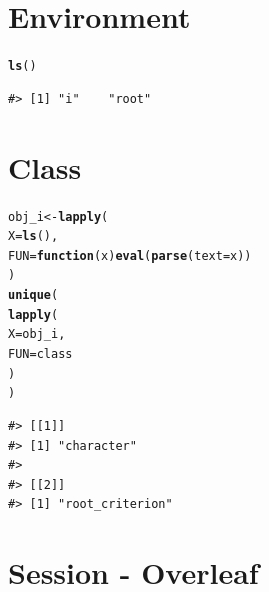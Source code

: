 \documentclass{article}\usepackage[]{graphicx}\usepackage{xcolor}
\makeatletter
\newcommand{\hlstd}[1]{\textcolor[rgb]{0.345,0.345,0.345}{#1}}%
\newcommand{\hlkwa}[1]{\textcolor[rgb]{0.161,0.373,0.58}{\textbf{#1}}}%
\newcommand{\hlkwb}[1]{\textcolor[rgb]{0.69,0.353,0.396}{#1}}%
\newcommand{\hlkwc}[1]{\textcolor[rgb]{0.333,0.667,0.333}{#1}}%
\newcommand{\hlkwd}[1]{\textcolor[rgb]{0.737,0.353,0.396}{\textbf{#1}}}%
\newenvironment{kframe}{%
 \def\at@end@of@kframe{}%
 \ifinner\ifhmode%
  \def\at@end@of@kframe{\end{minipage}}%
  \begin{minipage}{\columnwidth}%
 \fi\fi%
 \def\FrameCommand##1{\hskip\@totalleftmargin \hskip-\fboxsep
 \colorbox{shadecolor}{##1}\hskip-\fboxsep
     \hskip-\linewidth \hskip-\@totalleftmargin \hskip\columnwidth}%
 \MakeFramed {\advance\hsize-\width
   \@totalleftmargin\z@ \linewidth\hsize
   \@setminipage}}%
 {\par\unskip\endMakeFramed%
 \at@end@of@kframe}
\newenvironment{knitrout}{}{} %
\makeatother
\begin{document}
\newpage

\section*{Environment}

\begin{knitrout}
\color{fgcolor}\begin{kframe}
\begin{alltt}
\hlkwd{ls}\hlstd{()}
\end{alltt}
\begin{verbatim}
#> [1] "i"    "root"
\end{verbatim}
\end{kframe}
\end{knitrout}

\section*{Class}

\begin{knitrout}
\color{fgcolor}\begin{kframe}
\begin{alltt}
\hlstd{obj_i} \hlkwb{<-} \hlkwd{lapply}\hlstd{(}
  \hlkwc{X} \hlstd{=} \hlkwd{ls}\hlstd{(),}
  \hlkwc{FUN} \hlstd{=} \hlkwa{function}\hlstd{(}\hlkwc{x}\hlstd{)} \hlkwd{eval}\hlstd{(}\hlkwd{parse}\hlstd{(}\hlkwc{text} \hlstd{= x))}
\hlstd{)}
\hlkwd{unique}\hlstd{(}
  \hlkwd{lapply}\hlstd{(}
    \hlkwc{X} \hlstd{= obj_i,}
    \hlkwc{FUN} \hlstd{= class}
  \hlstd{)}
\hlstd{)}
\end{alltt}
\begin{verbatim}
#> [[1]]
#> [1] "character"
#> 
#> [[2]]
#> [1] "root_criterion"
\end{verbatim}
\end{kframe}
\end{knitrout}

\newpage

\section*{Session - Overleaf}
\end{document}
